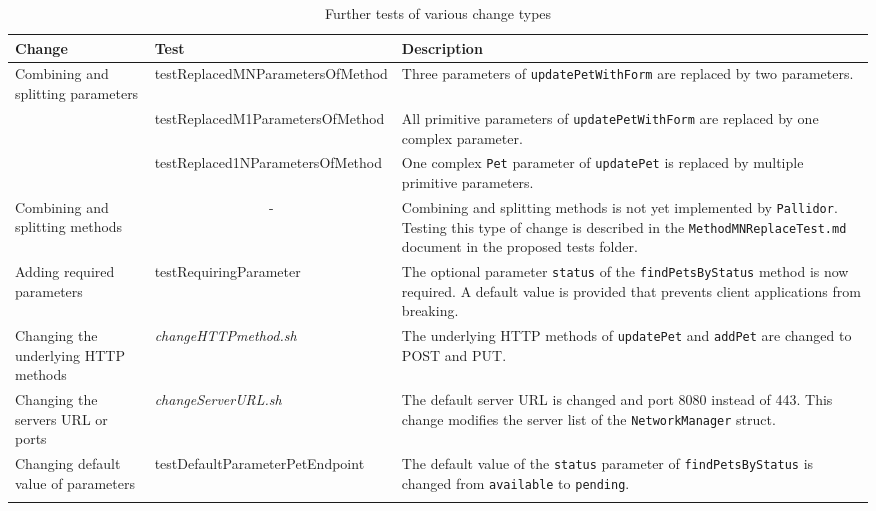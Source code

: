 	\begin{center}
	\begin{longtable}{@{}>{\raggedright\arraybackslash}p{}p{}p{}@{}}
		\toprule
		\textbf{Change} & \textbf{Test}  & \textbf{Description} \\ \midrule \endhead
	Combining and splitting parameters &      test\-Replaced\-MN\-Parameters\-Of\-Method         &             Three parameters of \texttt{updatePetWithForm} are replaced by two parameters.             \\
			&      test\-Replaced\-M1\-Parameters\-Of\-Method                    &         All primitive parameters of \texttt{updatePetWithForm} are replaced by one complex parameter.        \\
			&      test\-Replaced\-1N\-Parameters\-Of\-Method                     &         One complex \texttt{Pet} parameter of \texttt{updatePet} is replaced by multiple primitive parameters.             \\
Combining and splitting methods	&              \multicolumn{1}{c}{-}  &         Combining and splitting methods is not yet implemented by \texttt{Pallidor}. Testing this type of change is described in the \texttt{MethodMNReplaceTest.md} document in the proposed tests folder.                               \\
Adding required parameters &    test\-Requiring\-Parameter           &   The optional parameter \texttt{status} of the \texttt{findPetsByStatus} method is now required. A default value is provided that prevents client applications from breaking.                                       \\ 
	Changing the underlying HTTP methods	&     \textit{changeHTTPmethod.sh}         &      The underlying HTTP methods of \texttt{updatePet} and \texttt{addPet} are changed to POST and PUT.                                \\ \midrule
	\pagebreak Changing the servers URL or ports	&    \textit{changeServerURL.sh}           &         The default server URL is changed and port 8080 instead of 443. This change modifies the server list of the \texttt{NetworkManager} struct.     \\ 
	 Changing default value of parameters &    test\-Default\-Parameter\-Pet\-Endpoint          &   The default value of the \texttt{status} parameter of \texttt{find\-PetsByStatus} is changed from \texttt{available} to \texttt{pending}.     \\ \bottomrule
	\caption{Further tests of various change types}
\label{tab:OtherChangeTypesTests}	
\end{longtable}
\end{center}